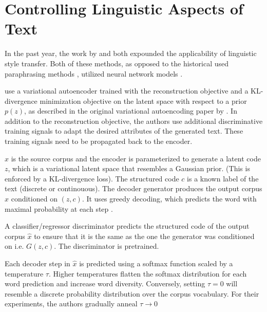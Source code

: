 \section{Controlling Linguistic Aspects of Text}

In the past year, the work by \citep{hu2017toward} and \citep{ficler2017controlling} both expounded the applicability of linguistic style transfer. Both of these methods, as opposed to the historical used paraphrasing methods \citep{xu2012paraphrasing}, utilized neural network models \citep{lecun2015deep}.

\citep{hu2017toward} use a variational autoencoder trained with the reconstruction objective and a KL-divergence minimization objective on the latent space with respect to a prior $p(z)$, as described in the original variational autoencoding paper by \cite{kingma2013auto}. In addition to the reconstruction objective, the authors use additional discriminative training signals to adapt the desired attributes of the generated text. These training signals need to be propagated back to the encoder.

$x$ is the source corpus and the encoder is parameterized to generate a latent code $z$, which is a variational latent space that resembles a Gaussian prior. (This is enforced by a KL-divergence loss). The structured code $c$ is a known label of the text (discrete or continouous). The decoder generator produces the output corpus $\hat{x}$ conditioned on $(z, c)$. It uses greedy decoding, which predicts the word with maximal probability at each step \cite{langlais2007greedy}.

A classifier/regressor discriminator predicts the structured code of the output corpus $\hat{x}$ to ensure that it is the same as the one the generator was conditioned on i.e. $G(z, c)$. The discriminator is pretrained.

Each decoder step in $\hat{x}$ is predicted using a softmax function scaled by a temperature $\tau$. Higher temperatures flatten the softmax distribution for each word prediction and increase word diversity. Conversely, setting $\tau = 0$ will resemble a discrete probability distribution over the corpus vocabulary. For their experiments, the authors gradually anneal $\tau \rightarrow 0$

